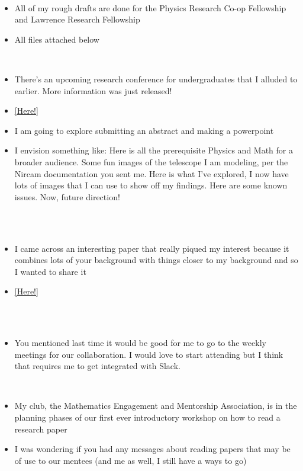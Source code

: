 \documentclass[a4 paper]{article}
\numberwithin{equation}{section}
\newcommand{\0}{\mathbf{0}}
\begin{document}
\clearpage {}\\
\begin{itemize}
    \item All of my rough drafts are done for the Physics Research Co-op Fellowship and Lawrence Research Fellowship 
    \item All files attached below
\end{itemize}
\\ 
\begin{itemize}
    \item There's an upcoming research conference for undergraduates that I alluded to earlier. More information was just released!
    \item \href{https://sites.google.com/brown.edu/sums}{[Here!]}
    \item I am going to explore submitting an abstract and making a powerpoint
    \item I envision something like: Here is all the prerequisite Physics and Math for a broader audience. Some fun images of the telescope I am modeling, per the Nircam documentation you sent me. Here is what I've explored, I now have lots of images that I can use to show off my findings. Here are some known issues. Now, future direction!
\end{itemize}\\
\\ 
\begin{itemize}
    \item I came across an interesting paper that really piqued my interest because it combines lots of your background with things closer to my background and so I wanted to share it
    \item \href{https://arxiv.org/abs/2103.09247}{[Here!]}
\end{itemize}\\
\\ 
\begin{itemize}
    \item You mentioned last time it would be good for me to go to the weekly meetings for our collaboration. I would love to start attending but I think that requires me to get integrated with Slack.
\end{itemize}
\\ 
\begin{itemize}
    \item My club, the Mathematics Engagement and Mentorship Association, is in the planning phases of our first ever introductory workshop on how to read a research paper
    \item I was wondering if you had any messages about reading papers that may be of use to our mentees (and me as well, I still have a ways to go)
\end{itemize}
\end{document}
